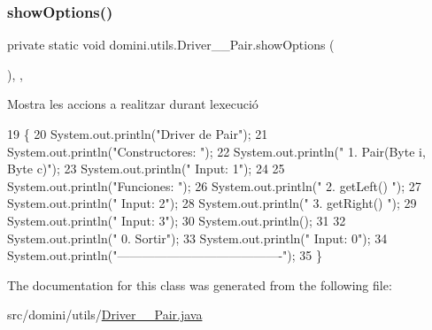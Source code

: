 \mbox{\label{classdomini_1_1utils_1_1Driver____Pair_a97596378f21ba4ab9c0c4ccb4041425b}} 
\subsubsection{\texorpdfstring{show\+Options()}{showOptions()}}
{\footnotesize\ttfamily private static void domini.\+utils.\+Driver\+\_\+\+\_\+\+Pair.\+show\+Options (\begin{DoxyParamCaption}{ }\end{DoxyParamCaption})\hspace{0.3cm}{\ttfamily [inline]}, {\ttfamily [static]}, {\ttfamily [private]}}



Mostra les accions a realitzar durant l\textquotesingle{}execució 


\begin{DoxyCode}
19                                      \{
20         System.out.println(\textcolor{stringliteral}{"Driver de Pair"});
21         System.out.println(\textcolor{stringliteral}{"Constructores: "});
22         System.out.println(\textcolor{stringliteral}{"     1. Pair(Byte i, Byte c)"});
23         System.out.println(\textcolor{stringliteral}{"     Input: 1"});
24 
25         System.out.println(\textcolor{stringliteral}{"Funciones: "});
26         System.out.println(\textcolor{stringliteral}{"     2. getLeft() "});
27         System.out.println(\textcolor{stringliteral}{"     Input: 2"});
28         System.out.println(\textcolor{stringliteral}{"     3. getRight() "});
29         System.out.println(\textcolor{stringliteral}{"     Input: 3"});
30         System.out.println();
31 
32         System.out.println(\textcolor{stringliteral}{"     0. Sortir"});
33         System.out.println(\textcolor{stringliteral}{"     Input: 0"});
34         System.out.println(\textcolor{stringliteral}{"----------------------------------------"});
35     \}
\end{DoxyCode}


The documentation for this class was generated from the following file\+:\begin{DoxyCompactItemize}
\item 
src/domini/utils/\hyperlink{Driver____Pair_8java}{Driver\+\_\+\+\_\+\+Pair.\+java}\end{DoxyCompactItemize}
